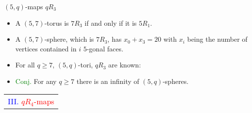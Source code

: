 \documentclass[%
pdf,
colorBG,
slideColor,
]{prosper}
\begin{document}
\begin{slide}{$(5,q)$-maps $qR_3$}
\begin{itemize}
\item A $(5,7)$-torus is $7R_3$ if and only if it is $5R_1$.
\item A $(5,7)$-sphere, which is $7R_3$, has $x_0+x_3=20$ with $x_i$ being the number of vertices contained in $i$ $5$-gonal faces.
\item For all $q\geq 7$, $(5,q)$-tori, $qR_3$ are known:
\begin{center}
\begin{minipage}{3.5cm}
\centering
{}\par
\end{minipage}
\begin{minipage}{3.5cm}
\centering
{}\par
\end{minipage}
\begin{minipage}{3.5cm}
\centering
{}\par
\end{minipage}
\end{center}
\item \textcolor{green}{Conj.} For any $q\geq 7$ there is an infinity of $(5,q)$-spheres.
\end{itemize}

\end{slide}





\begin{slide}{}
\begin{center}
{\Huge 
\begin{tabular*}{7cm}{c}
\\[-0.5cm]
\textcolor{blue}{III. }\textcolor{red}{$qR_4$-maps}
\end{tabular*}
}
\end{center}
\end{slide}
\end{document}
